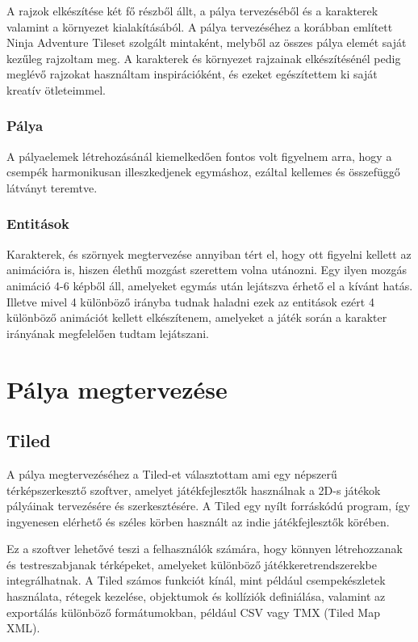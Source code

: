 A rajzok elkészítése két fő részből állt, a pálya tervezéséből és a karakterek valamint a környezet kialakításából. A pálya tervezéséhez a korábban említett Ninja Adventure Tileset szolgált mintaként, melyből az összes pálya elemét saját kezűleg rajzoltam meg. A karakterek és környezet rajzainak elkészítésénél pedig meglévő rajzokat használtam inspirációként, és ezeket egészítettem ki saját kreatív ötleteimmel.

\subsubsection{Pálya}
A pályaelemek létrehozásánál kiemelkedően fontos volt figyelnem arra, hogy a csempék harmonikusan illeszkedjenek egymáshoz, ezáltal kellemes és összefüggő látványt teremtve.

\subsubsection{Entitások}
Karakterek, és szörnyek megtervezése annyiban tért el, hogy ott figyelni kellett az animációra is, hiszen élethű mozgást szerettem volna utánozni. Egy ilyen mozgás animáció 4-6 képből áll, amelyeket egymás után lejátszva érhető el a kívánt hatás. Illetve mivel 4 különböző irányba tudnak haladni ezek az entitások ezért 4 különböző animációt kellett elkészítenem, amelyeket a játék során a karakter irányának megfelelően tudtam lejátszani.



\section{Pálya megtervezése}

\subsection{Tiled}
\label{subsec:Tiled}
A pálya megtervezéséhez a Tiled-et \cite{Tiled} választottam ami egy népszerű térképszerkesztő szoftver, amelyet játékfejlesztők használnak a 2D-s játékok pályáinak tervezésére és szerkesztésére. A Tiled egy nyílt forráskódú program, így ingyenesen elérhető és széles körben használt az indie játékfejlesztők körében.

Ez a szoftver lehetővé teszi a felhasználók számára, hogy könnyen létrehozzanak és testreszabjanak térképeket, amelyeket különböző játékkeretrendszerekbe integrálhatnak. A Tiled számos funkciót kínál, mint például csempekészletek használata, rétegek kezelése, objektumok és kollíziók definiálása, valamint az exportálás különböző formátumokban, például CSV vagy TMX (Tiled Map XML).

